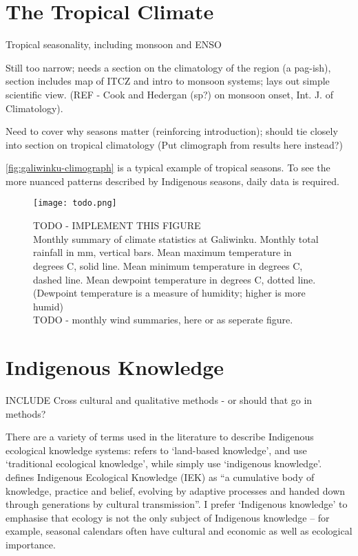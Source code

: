 \section{The Tropical Climate}

Tropical seasonality, including monsoon and ENSO

Still too narrow; needs a section on the climatology of the region (a pag-ish),
section includes map of ITCZ and intro to monsoon systems; lays out simple scientific view.
(REF - Cook and Hedergan (sp?) on monsoon onset, Int. J. of Climatology).

Need to cover why seasons matter (reinforcing introduction); should tie
closely into section on tropical climatology (Put climograph from results here instead?)



\autoref{fig:galiwinku-climograph} is a typical example of tropical seasons.
To see the more nuanced patterns described by Indigenous seasons, daily data is required.

\begin{figure}[h]
    \centering
    \texttt{[image: todo.png]}
    \caption[Monthly Climograph for Galiwinku]{
        TODO - IMPLEMENT THIS FIGURE\\
        Monthly summary of climate statistics at Galiwinku.
        Monthly total rainfall in mm, vertical bars.
        Mean maximum temperature in degrees C, solid line.
        Mean minimum temperature in degrees C, dashed line.
        Mean dewpoint temperature in degrees C, dotted line.
        (Dewpoint temperature is a measure of humidity; higher is more humid)
        ~\\
        TODO - monthly wind summaries, here or as seperate figure.
        }
    \label{fig:galiwinku-climograph}
\end{figure}


\section{Indigenous Knowledge}

INCLUDE Cross cultural and qualitative methods - or should that go in methods?


There are a variety of terms used in the literature to describe Indigenous 
ecological knowledge systems:  \citet{clarke2009} refers to `land-based knowledge', 
\citet{petheram2010} and \citet{turner2009} use `traditional ecological 
knowledge', while \citet{cochran2015} simply use `indigenous knowledge'.  
\citet{berkes2012} defines Indigenous Ecological Knowledge (IEK) as ``a cumulative 
body of knowledge, practice and belief, evolving by adaptive processes and 
handed down through generations by cultural transmission''.  I prefer 
`Indigenous knowledge' to emphasise that ecology is not the only subject of 
Indigenous knowledge – for example, seasonal calendars often have cultural and 
economic as well as ecological importance.

